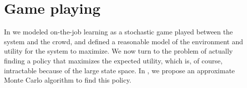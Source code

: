 \section{Game playing}
\label{sec:game-playing}

In  we modeled on-the-job learning as a stochastic game played between the system and the crowd, and defined a reasonable model of the environment and utility for the system to maximize.
We now turn to the problem of actually finding a policy that maximizes the expected utility,
which is, of course, intractable because of the large state space.
In , we propose an approximate Monte Carlo algorithm to find this policy. 




